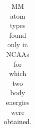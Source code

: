 \begin{table}
  \caption{MM atom types found only in NCAAs for which two body energies were obtained.}
  \label{tab:atypes_all}

  \begin{tabular}{c|l}

\end{tabular}
\end{table}
